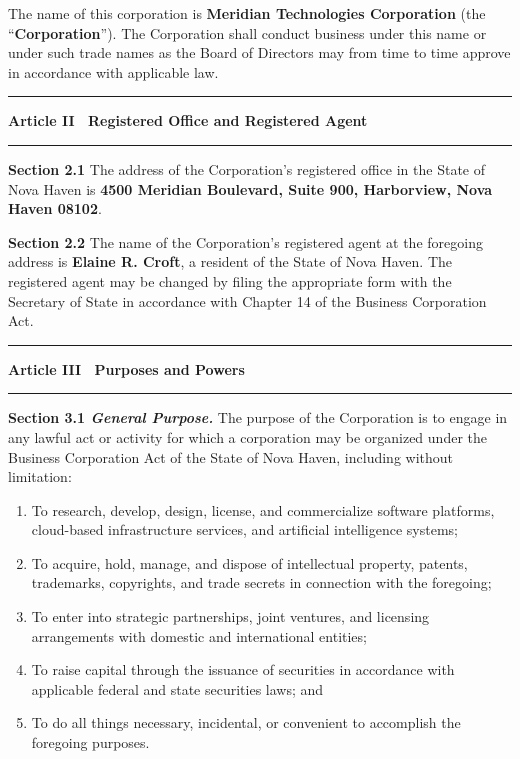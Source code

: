 \documentclass[12pt,a4paper]{scrartcl}
\newcommand{\articletitle}[1]{%
  \par\vspace{4pt}\noindent%
  {\color{GoldAccent}\rule{\linewidth}{1.2pt}}\par\vspace{2pt}\noindent%
  {\large\bfseries\color{NavyDeep}#1}\par\vspace{4pt}\noindent%
  {\color{RuleGray}\rule{\linewidth}{0.4pt}}\par\vspace{6pt}\noindent%
}
\newcommand{\sectionlabel}[1]{%
  \noindent\textbf{\color{NavyDeep}#1}\quad%
}
\begin{document}
The name of this corporation is \textbf{Meridian Technologies Corporation} (the
``\textbf{Corporation}''). The Corporation shall conduct business under this name or under
such trade names as the Board of Directors may from time to time approve in accordance with
applicable law.

\articletitle{Article II \textemdash\ Registered Office and Registered Agent}

\sectionlabel{Section 2.1}The address of the Corporation's registered office in the State of
Nova Haven is \textbf{4500 Meridian Boulevard, Suite 900, Harborview, Nova Haven 08102}.

\sectionlabel{Section 2.2}The name of the Corporation's registered agent at the foregoing
address is \textbf{Elaine R. Croft}, a resident of the State of Nova Haven. The registered
agent may be changed by filing the appropriate form with the Secretary of State in accordance
with Chapter 14 of the Business Corporation Act.

\articletitle{Article III \textemdash\ Purposes and Powers}

\sectionlabel{Section 3.1 \textit{General Purpose.}}The purpose of the Corporation is to
engage in any lawful act or activity for which a corporation may be organized under the
Business Corporation Act of the State of Nova Haven, including without limitation:

\begin{enumerate}[label=\textbf{(\alph*)}, leftmargin=2.2em, itemsep=3pt]
  \item To research, develop, design, license, and commercialize software platforms,
        cloud-based infrastructure services, and artificial intelligence systems;
  \item To acquire, hold, manage, and dispose of intellectual property, patents, trademarks,
        copyrights, and trade secrets in connection with the foregoing;
  \item To enter into strategic partnerships, joint ventures, and licensing arrangements
        with domestic and international entities;
  \item To raise capital through the issuance of securities in accordance with applicable
        federal and state securities laws; and
  \item To do all things necessary, incidental, or convenient to accomplish the foregoing
        purposes.
\end{enumerate}
\end{document}
